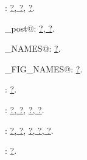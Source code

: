 \documentclass[twoside]{artikel3}
\renewcommand{\NWlink}[2]{\hyperlink{#1}{#2}}
\renewcommand{\NWlink}[2]{\hyperlink{#1}{#2}}
\begin{document}
{\begin{list}{}{\setlength{\itemsep}{-\parsep}\setlength{\itemindent}{-\leftmargin}}
\item \verb@print@: \NWlink{nuweb?}{?}\NWlink{nuweb?}{, ?}, \underline{\NWlink{nuweb?}{?}}.
\item \verb@print_post@: \underline{\NWlink{nuweb?}{?}}\NWlink{nuweb?}{, ?}.
\item \verb@PST_NAMES@: \underline{\NWlink{nuweb?}{?}}.
\item \verb@PS_FIG_NAMES@: \underline{\NWlink{nuweb?}{?}}.
\item \verb@SUFFIXES@: \underline{\NWlink{nuweb?}{?}}.
\item \verb@texfil@: \underline{\NWlink{nuweb?}{?}}\NWlink{nuweb?}{, ?}, \underline{\NWlink{nuweb?}{?}}\NWlink{nuweb?}{, ?}.
\item \verb@trunk@: \underline{\NWlink{nuweb?}{?}}\NWlink{nuweb?}{, ?}, \underline{\NWlink{nuweb?}{?}}\NWlink{nuweb?}{, ?}\NWlink{nuweb?}{, ?}.
\item \verb@view@: \underline{\NWlink{nuweb?}{?}}.
\end{list}}
\end{document}
